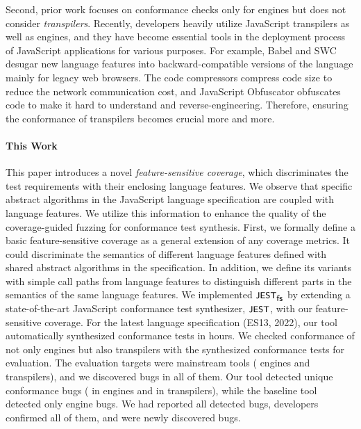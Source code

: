 
Second, prior work focuses on conformance checks only for engines but does not
consider \textit{transpilers}.
%
Recently, developers heavily utilize JavaScript transpilers as well as engines,
and they have become essential tools in the deployment process of JavaScript
applications for various purposes.
%
For example, Babel and SWC desugar new language features into
backward-compatible versions of the language mainly for legacy web browsers.
%
The code compressors compress code size to reduce the network communication
cost, and JavaScript Obfuscator obfuscates code to make it hard to understand
and reverse-engineering.
%
Therefore, ensuring the conformance of transpilers becomes crucial more and
more.



\paragraph{\textbf{This Work}}

This paper introduces a novel \textit{feature-sensitive coverage}, which
discriminates the test requirements with their enclosing language features.
%
We observe that specific abstract algorithms in the JavaScript language
specification are coupled with language features.
%
We utilize this information to enhance the quality of the coverage-guided
fuzzing for conformance test synthesis.
%
First, we formally define a basic feature-sensitive coverage as a general
extension of any coverage metrics.
%
It could discriminate the semantics of different language features defined with
shared abstract algorithms in the specification.
%
In addition, we define its variants with simple call paths from language
features to distinguish different parts in the semantics of the same language
features.
%
We implemented $\textsf{\small JEST}_{\textsf{\small fs}}$ by extending a state-of-the-art JavaScript conformance
test synthesizer, $\textsf{\small JEST}$, with our feature-sensitive coverage.
%
For the latest language specification (ES13, 2022), our tool automatically
synthesized  conformance tests in  hours.
%
We checked conformance of not only engines but also transpilers with the
synthesized conformance tests for evaluation.
%
The evaluation targets were  mainstream tools ( engines
and  transpilers), and we discovered bugs in all of them.
%
Our tool detected  unique conformance bugs ( in engines and
 in transpilers), while the baseline tool detected only 
engine bugs.
%
We had reported all detected bugs, developers confirmed all of them, and
 were newly discovered bugs.
%

